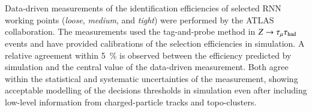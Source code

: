 Data-driven measurements of the \tauhadvis identification efficiencies of
selected RNN \tauid working points (\emph{loose}, \emph{medium}, and
\emph{tight}) were performed by the ATLAS collaboration. The measurements used
the tag-and-probe method in $Z \to \tau_\mu \tau_{\text{had}}$ events and have provided
calibrations of the \tauhadvis selection efficiencies in simulation. A relative
agreement within \SI{5}{\percent} is observed between the efficiency predicted
by simulation and the central value of the data-driven measurement.
Both agree within the statistical and systematic uncertainties of the
measurement, showing acceptable modelling of the \tauid decisions thresholds in
simulation even after including low-level information from charged-particle
tracks and topo-clusters.

